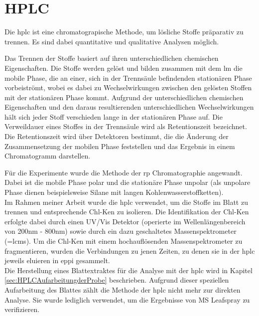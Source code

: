 \section{HPLC}

Die \gls{hplc} ist eine chromatograpische Methode, um lösliche Stoffe präparativ zu trennen. Es sind dabei quantitative und qualitative Analysen möglich. \cite[S. 165]{Chromatographie} 

Das Trennen der Stoffe basiert auf ihren unterschiedlichen chemischen Eigenschaften. Die Stoffe werden gelöst und bilden zusammen mit dem \gls{lm} die mobile Phase, die an einer, sich in der Trennsäule befindenden stationären Phase vorbeiströmt, wobei es dabei zu Wechselwirkungen zwischen den gelösten Stoffen mit der stationären Phase kommt. Aufgrund der unterschiedlichen chemischen Eigenschaften und den daraus resultierenden unterschiedlichen Wechselwirkungen hält sich jeder Stoff verschieden lange in der stationären Phase auf. Die Verweildauer eines Stoffes in der Trennsäule wird als Retentionszeit bezeichnet. \cite[S. 31-32]{Chromatographie} Die Retentionszeit wird über Detektoren bestimmt, die die Änderung der Zusammensetzung der mobilen Phase feststellen und das Ergebnis in einem Chromatogramm darstellen. \cite[S. 46]{Chromatographie} 

Für die Experimente wurde die Methode der \gls{rp} Chromatographie angewandt. Dabei ist die mobile Phase polar und die stationäre Phase unpolar (als unpolare Phase dienen beispielsweise Silane mit langen Kohlenwasserstoffketten). \cite[S. 189]{Chromatographie}\\

Im Rahmen meiner Arbeit wurde die \gls{hplc} verwendet, um die Stoffe im Blatt zu trennen und entsprechende \gls{Chl-K}en zu isolieren. Die Identifikation der \gls{Chl-K}en erfolgte dabei durch einen UV/Vis Detektor (operierte im Wellenlängenbereich von 200nm - 800nm) sowie durch ein dazu geschaltetes Massenspektrometer (=\gls{lcms}). Um die \gls{Chl-K}en mit einem hochauflösenden Massenspektrometer zu fragmentieren, wurden die Verbindungen zu jenen Zeiten, zu denen sie in der \gls{hplc} jeweils eluieren in \gls{eppi} gesammelt.\\

Die Herstellung eines Blattextraktes für die Analyse mit der \gls{hplc} wird in Kapitel \ref{sec:HPLCAufarbeitungderProbe} beschrieben. Aufgrund dieser speziellen Aufarbeitung des Blattes zählt die Methode der \gls{hplc} nicht mehr zur direkten Analyse. Sie wurde lediglich verwendet, um die Ergebnisse von MS Leafspray zu verifizieren.
